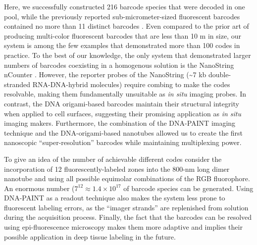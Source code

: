 Here, we successfully constructed 216 barcode species that 
were decoded in one pool, while the previously reported sub-micrometer-sized 
fluorescent barcodes contained no more than 11 distinct barcodes \citep{li_multiplexed_2005, fournier-bidoz_facile_2008, li_controlled_2010, levsky_single-cell_2002}. Even compared 
to the prior art of producing multi-color fluorescent barcodes that are less than 10 \textmu m in 
size, our system is among the few examples \citep{fournier-bidoz_facile_2008, geiss_direct_2008} that demonstrated more than 100 codes in 
practice. To the best of our knowledge, the only system that demonstrated larger numbers 
of barcodes coexisting in a homogenous solution is the NanoString nCounter \citep{ geiss_direct_2008}. However, 
the reporter probes of the NanoString (\textasciitilde7 kb double-stranded RNA-DNA-hybrid 
molecules) require combing to make the codes resolvable, making them fundamentally 
unsuitable as \textit{in situ} imaging probes. In contrast, the DNA origami-based barcodes 
maintain their structural integrity when applied to cell surfaces, suggesting their 
promising application as \textit{in situ} imaging makers. Furthermore, the combination of the 
DNA-PAINT imaging technique and the DNA-origami-based nanotubes allowed us to 
create the first nanoscopic ``super-resolution'' barcodes while maintaining  
multiplexing power. 

To give an idea of the number of achievable different codes  
consider the incorporation of 12 fluorescently-labeled zones into the 800-nm long dimer 
nanotube and using all possible equimolar combinations of the RGB fluorophore. An 
enormous number ($7^{12}\approx 1.4  \times 10^17$ of barcode
species can be generated. Using DNA-PAINT as a readout technique also makes the system less prone to fluorescent labeling 
errors, as the ``imager strands'' are replenished from solution during the acquisition 
process. Finally, the fact that the barcodes can be resolved using epi-fluorescence 
microscopy makes them more adaptive and implies their possible application in deep 
tissue labeling in the future. 


